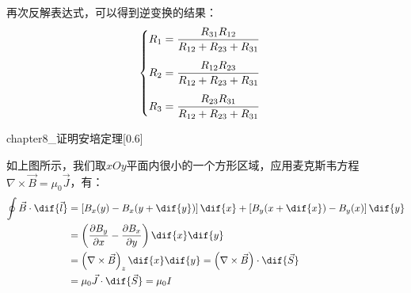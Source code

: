 \begin{prove}[Y-$\Delta$等效]
    再次反解表达式，可以得到逆变换的结果：
    \begin{align*}
        \begin{cases}
            \vspace{3mm}
            R_1 = \dfrac{R_{31}R_{12}}{R_{12} + R_{23} + R_{31}}\\
            \vspace{3mm}
            R_2 = \dfrac{R_{12}R_{23}}{R_{12} + R_{23} + R_{31}}\\
            R_3 = \dfrac{R_{23}R_{31}}{R_{12} + R_{23} + R_{31}}\\
        \end{cases}
    \end{align*}
    
\end{prove}

\begin{prove}
    \begin{singlefigure}[安培定理的证明]{chapter8_证明安培定理}[0.6]
    \end{singlefigure}
    如上图所示，我们取$xOy$平面内很小的一个方形区域，应用麦克斯韦方程$\nabla\times\vec{B}=\mu_0\vec{J}$，有：
    \begin{align*}
        \oint \vec{B} \cdot \dif{\vec{l}} &= \left[ B_x(y) - B_x(y + \dif{y}) \right] \dif{x} + \left[ B_y(x + \dif{x}) - B_y(x) \right] \dif{y}\\
                                        &= \left( \dfrac{\partial B_y}{\partial x} - \dfrac{\partial B_x}{\partial y} \right) \dif{x} \dif{y} \\
                                        &= \left( \nabla \times \vec{B} \right)_z \dif{x} \dif{y} = \left( \nabla \times \vec{B} \right) \cdot \dif{\vec{S}} \\
                                        &= \mu_0 \vec{J} \cdot \dif{\vec{S}} = \mu_0 I
    \end{align*}
\end{prove}

